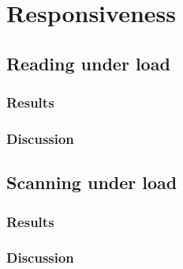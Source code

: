 \section{Responsiveness}

\subsection{Reading under load}

\subsubsection{Results}

\subsubsection{Discussion}

\subsection{Scanning under load}

\subsubsection{Results}

\subsubsection{Discussion}
